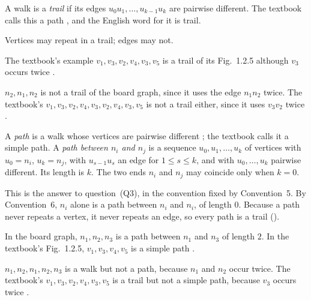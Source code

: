 \begin{definition}\label{def:trail}
A walk is a \emph{trail} if its edges $u_0u_1,\dots,u_{k-1}u_k$ are pairwise different. The textbook calls this a path \cite[Def.~1.2.12, p.~22]{petrosyan2015grafneri}, and the English word for it is trail.
\end{definition}
\begin{remark}
Vertices may repeat in a trail; edges may not.
\end{remark}
\begin{example}
The textbook's example $v_1,v_3,v_2,v_4,v_3,v_5$ is a trail of its Fig.~1.2.5 although $v_3$ occurs twice \cite[p.~22]{petrosyan2015grafneri}.
\end{example}
\begin{nonexample}
$n_2,n_1,n_2$ is not a trail of the board graph, since it uses the edge $n_1n_2$ twice. The textbook's $v_1,v_3,v_2,v_4,v_3,v_2,v_4,v_3,v_5$ is not a trail either, since it uses $v_3v_2$ twice \cite[p.~22]{petrosyan2015grafneri}.
\end{nonexample}

\begin{definition}\label{def:path}
A \emph{path} is a walk whose vertices are pairwise different \cite[Def.~1.2.13, p.~22]{petrosyan2015grafneri}; the textbook calls it a simple path. A \emph{path between $n_i$ and $n_j$} is a sequence $u_0,u_1,\dots,u_k$ of vertices with $u_0=n_i$, $u_k=n_j$, with $u_{s-1}u_s$ an edge for $1\le s\le k$, and with $u_0,\dots,u_k$ pairwise different. Its length is $k$. The two ends $n_i$ and $n_j$ may coincide only when $k=0$.
\end{definition}
\begin{remark}
This is the answer to question~(Q3), in the convention fixed by Convention~5. By Convention~6, $n_i$ alone is a path between $n_i$ and $n_i$, of length $0$. Because a path never repeats a vertex, it never repeats an edge, so every path is a trail ().
\end{remark}
\begin{example}
In the board graph, $n_1,n_2,n_3$ is a path between $n_1$ and $n_3$ of length $2$. In the textbook's Fig.~1.2.5, $v_1,v_3,v_4,v_5$ is a simple path \cite[p.~22]{petrosyan2015grafneri}.
\end{example}
\begin{nonexample}
$n_1,n_2,n_1,n_2,n_3$ is a walk but not a path, because $n_1$ and $n_2$ occur twice. The textbook's $v_1,v_3,v_2,v_4,v_3,v_5$ is a trail but not a simple path, because $v_3$ occurs twice \cite[p.~22]{petrosyan2015grafneri}.
\end{nonexample}

